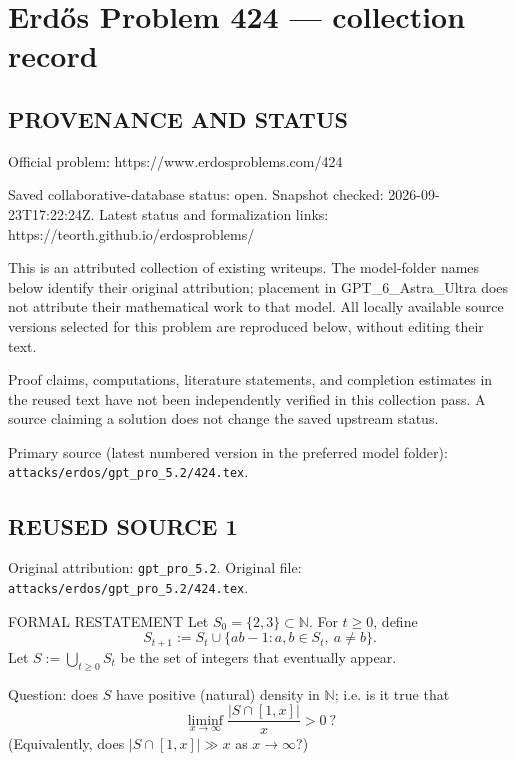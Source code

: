 \section*{Erd\H{o}s Problem 424 --- collection record}

\subsection*{PROVENANCE AND STATUS}
Official problem: https://www.erdosproblems.com/424

Saved collaborative-database status: open.
Snapshot checked: 2026-09-23T17:22:24Z.
Latest status and formalization links: https://teorth.github.io/erdosproblems/

This is an attributed collection of existing writeups. The model-folder names below identify their original attribution; placement in GPT\_6\_Astra\_Ultra does not attribute their mathematical work to that model. All locally available source versions selected for this problem are reproduced below, without editing their text.

Proof claims, computations, literature statements, and completion estimates in the reused text have not been independently verified in this collection pass. A source claiming a solution does not change the saved upstream status.

Primary source (latest numbered version in the preferred model folder): \texttt{attacks/erdos/gpt\_pro\_5.2/424.tex}.

\subsection*{REUSED SOURCE 1}
Original attribution: \texttt{gpt\_pro\_5.2}.
Original file: \texttt{attacks/erdos/gpt\_pro\_5.2/424.tex}.


FORMAL RESTATEMENT
Let $S_0=\{2,3\}\subset\mathbb N$. For $t\ge 0$, define
\[
 S_{t+1}:=S_t\cup\{ab-1: a,b\in S_t,\ a\ne b\}.
\]
Let $S:=\bigcup_{t\ge 0}S_t$ be the set of integers that eventually appear.

Question: does $S$ have positive (natural) density in $\mathbb N$; i.e. is it true that
\[
 \liminf_{x\to\infty}\frac{|S\cap[1,x]|}{x}>0\ ?
\]
(Equivalently, does $|S\cap[1,x]|\gg x$ as $x\to\infty$?)

